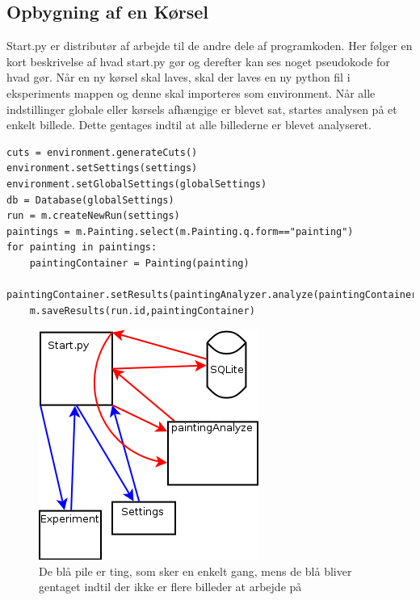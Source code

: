 {
\subsection{Opbygning af en Kørsel}
Start.py er distributør af arbejde til de andre dele af programkoden.
Her følger en kort beskrivelse af hvad start.py gør og derefter kan ses
noget pseudokode for hvad gør.
Når en ny kørsel skal laves, skal der laves en ny python fil i
eksperiments mappen og denne skal importeres som environment.
Når alle indstillinger globale eller kørsels afhængige er blevet sat,
startes analysen på et enkelt billede. Dette gentages indtil at alle
billederne er blevet analyseret.

\begin{lstlisting}
cuts = environment.generateCuts()
environment.setSettings(settings)
environment.setGlobalSettings(globalSettings)
db = Database(globalSettings)
run = m.createNewRun(settings)
paintings = m.Painting.select(m.Painting.q.form=="painting")
for painting in paintings:
	paintingContainer = Painting(painting)
	paintingContainer.setResults(paintingAnalyzer.analyze(paintingContainer,settings))
	m.saveResults(run.id,paintingContainer)
\end{lstlisting}
\begin{figure}[h!]
	\begin{center}
		\includegraphics[scale=0.5]{afsnit/implementation/billeder/workflow_start_py.png}
	\end{center}
	\caption{De blå pile er ting, som sker en enkelt gang, mens de blå
	bliver gentaget indtil der ikke er flere billeder at arbejde på}
\end{figure}
	
}

